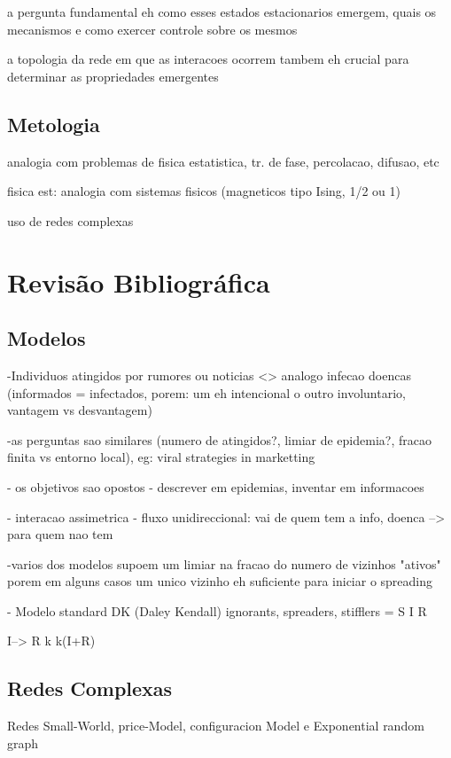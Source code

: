 \documentclass[a4paper,11pt]{report}
\begin{document}
a pergunta fundamental eh como esses estados estacionarios emergem, 
quais os mecanismos e como exercer controle sobre os mesmos


a topologia da rede em que as interacoes ocorrem tambem eh 
crucial para determinar as propriedades emergentes 

\section{Metologia} 

analogia com problemas de fisica estatistica, tr. de fase, percolacao, difusao, etc

fisica est: analogia com sistemas fisicos (magneticos tipo Ising, 1/2 ou 1)

uso de redes complexas

\chapter{Revis\~ao Bibliogr\'afica}
\label{chap:models}

\section{Modelos}
-Individuos atingidos por rumores ou noticias <> analogo infecao doencas
(informados = infectados, porem: um eh intencional o outro involuntario, 
vantagem vs desvantagem) 

-as perguntas sao similares (numero de atingidos?, limiar de epidemia?, 
fracao finita vs entorno local), eg: viral strategies in marketting

- os objetivos sao opostos
- descrever em epidemias, inventar em informacoes

- interacao assimetrica
- fluxo unidireccional: vai de quem tem a info, doenca --> para quem nao tem 

-varios dos modelos supoem um limiar na fracao do numero de vizinhos "ativos"
porem em alguns casos um unico vizinho eh suficiente para iniciar o spreading

- Modelo standard DK (Daley Kendall) 
ignorants, spreaders, stifflers = S I R

I--> R
  k
  k(I+R)
\section{Redes Complexas}
Redes Small-World, price-Model, configuracion Model e Exponential random graph
\end{document}
